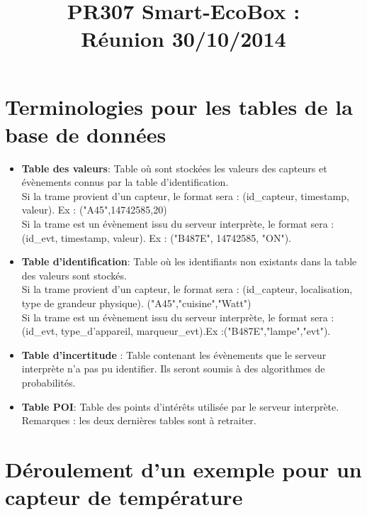 \documentclass[10pt,a4paper]{article}
\title{PR307 Smart-EcoBox : \\ Réunion 30/10/2014}
\begin{document}
\maketitle

\section {Terminologies pour les tables de la base de données}
\begin{itemize}
\item \textbf{Table des valeurs}: Table où sont stockées les valeurs des capteurs et évènements connus par la table d'identification.\\
Si la trame provient d'un capteur, le format sera : (id\_capteur, timestamp, valeur). Ex : ("A45",14742585,20)\\
Si la trame est un évènement issu du serveur interprète, le format sera : (id\_evt, timestamp, valeur). Ex : ("B487E", 14742585, "ON").
\item \textbf{Table d'identification}: Table où les identifiants non existants dans la table des valeurs sont stockés.\\ 
Si la trame provient d'un capteur, le format sera : (id\_capteur, localisation, type de grandeur physique). ("A45","cuisine","Watt")\\
Si la trame est un évènement issu du serveur interprète, le format sera : (id\_evt, type\_d'appareil, marqueur\_evt).Ex :("B487E","lampe","evt").
\item \textbf{Table d'incertitude} : Table contenant les évènements que le serveur interprète n'a pas pu identifier. Ils seront soumis à des algorithmes de probabilités.
\item \textbf{Table POI}: Table des points d'intérêts utilisée par le serveur interprète. 
Remarques : les deux dernières tables sont à retraiter.
\end{itemize}

\section{Déroulement d'un exemple pour un capteur de température}
\end{document}
